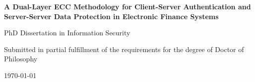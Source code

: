 \begin{titlepage}
\centering
\vspace*{3cm}
{\Huge\bfseries A Dual-Layer ECC Methodology for Client-Server Authentication and Server-Server Data Protection in Electronic Finance Systems\par}
\vspace{1.5cm}
{\Large PhD Dissertation in Information Security\par}
\vspace{4cm}
{\large Submitted in partial fulfillment of the requirements
for the degree of Doctor of Philosophy\par}
\vfill
{\large \today\par}
\end{titlepage}
